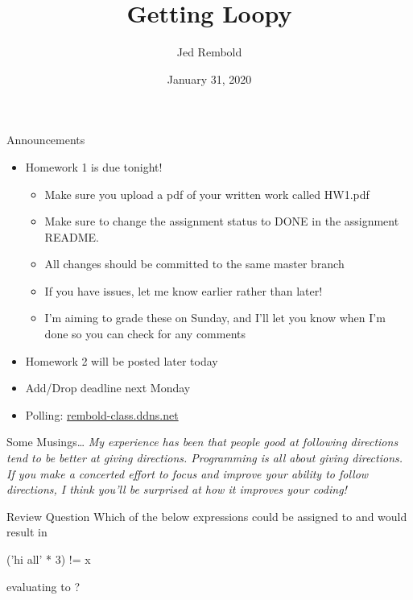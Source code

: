 \documentclass[pdf, aspectratio=169, 12pt]{beamer}
\title{Getting Loopy}
\author{Jed Rembold}
\date{January 31, 2020}
\begin{document}
\begin{frame}{Announcements}
	\begin{itemize}
		\item Homework 1 is due tonight!
			\begin{itemize}
				\item Make sure you upload a pdf of your written work called HW1.pdf
				\item Make sure to change the assignment status to DONE in the assignment README.
				\item All changes should be committed to the same master branch
				\item If you have issues, let me know earlier rather than later!
				\item I'm aiming to grade these on Sunday, and I'll let you know when I'm done so you can check for any comments
			\end{itemize}
		\item Homework 2 will be posted later today
		\item Add/Drop deadline next Monday
		\item Polling: \url{rembold-class.ddns.net}
	\end{itemize}
\end{frame}

\begin{frame}{Some Musings\ldots}
		\emph{My experience has been that people good at following directions tend to be better at giving directions. Programming is all about giving directions. If you make a concerted effort to focus and improve your ability to follow directions, I think you'll be surprised at how it improves your coding!}
\end{frame}

\begin{frame}[fragile]{Review Question}
	Which of the below expressions could be assigned to  and would result in
	\begin{pythoncode}
		('hi all' * 3) != x
	\end{pythoncode}
	evaluating to ?
	\begin{poll}
	\item {}
	\item {}
	\item {}
	\item {}
	\end{poll}

\end{frame}
\end{document}
